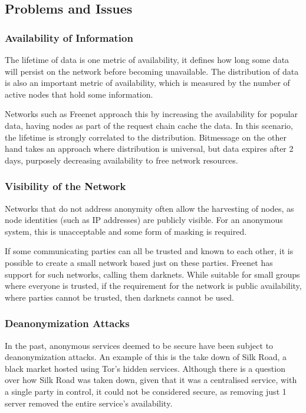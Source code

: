 	\subsection{Problems and Issues}
		\subsubsection*{Availability of Information}
			The lifetime of data is one metric of availability, it defines how long some data will persist on the network before becoming unavailable. The distribution of data is also an important metric of availability, which is measured by the number of active nodes that hold some information.
			
			Networks such as Freenet approach this by increasing the availability for popular data, having nodes as part of the request chain cache the data. In this scenario, the lifetime is strongly correlated to the distribution. Bitmessage on the other hand takes an approach where distribution is universal, but data expires after 2 days, purposely decreasing availability to free network resources.
		\subsubsection*{Visibility of the Network}
			Networks that do not address anonymity often allow the harvesting of nodes, as node identities (such as IP addresses) are publicly visible. For an anonymous system, this is unacceptable and some form of masking is required.
			
			If some communicating parties can all be trusted and known to each other, it is possible to create a small network based just on these parties. Freenet has support for such networks, calling them darknets. While suitable for small groups where everyone is trusted, if the requirement for the network is public availability, where parties cannot be trusted, then darknets cannot be used.
		\subsubsection*{Deanonymization Attacks}
			In the past, anonymous services deemed to be secure have been subject to deanonymization attacks. An example of this is the take down of Silk Road, a black market hosted using Tor's hidden services. Although there is a question over how Silk Road was taken down, given that it was a centralised service, with a single party in control, it could not be considered secure, as removing just 1 server removed the entire service's availability. 
